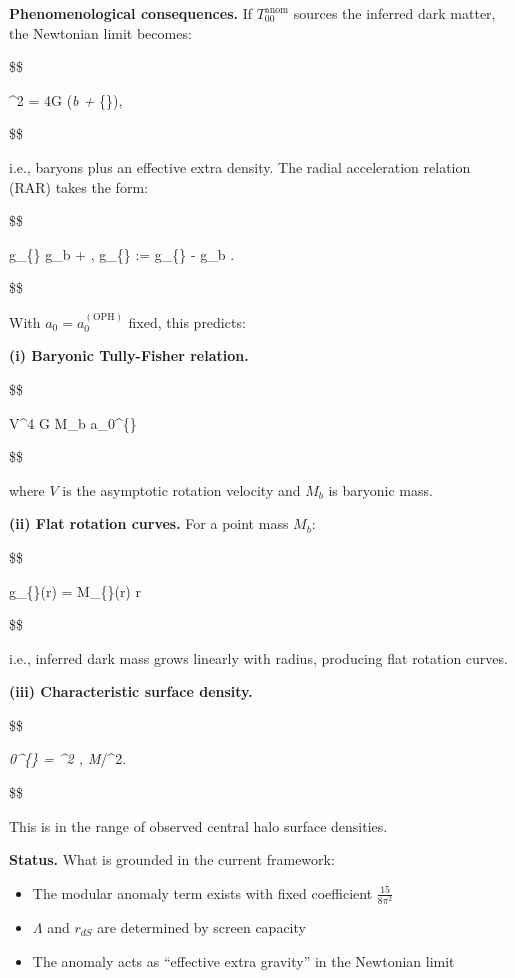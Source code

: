 \documentclass[11pt,a4paper]{article}
\theoremstyle{remark}
\providecommand{\tightlist}{%
  \setlength{\itemsep}{0pt}\setlength{\parskip}{0pt}}
\begin{document}
\textbf{Phenomenological consequences.} If \(T_{00}^{\mathrm{anom}}\) sources the
inferred dark matter, the Newtonian limit becomes:

\$\$

\nabla\^{}2 \Phi = 4\pi G (\rho\emph{b + \rho}\{\}),

\$\$

i.e., baryons plus an effective extra density. The radial acceleration
relation (RAR) takes the form:

\$\$

g\_\{\} \approx g\_b + ,
\quad
g\_\{\} := g\_\{\} - g\_b \approx {}.

\$\$

With \(a_0 = a_0^{\mathrm{(OPH)}}\) fixed, this predicts:

\textbf{(i) Baryonic Tully-Fisher relation.}

\$\$

V\^{}4 \approx G \cdot M\_b \cdot a\_0\^{}\{\}

\$\$

where \(V\) is the asymptotic rotation velocity and \(M_b\) is baryonic mass.

\textbf{(ii) Flat rotation curves.} For a point mass \(M_b\):

\$\$

g\_\{\}(r) = 
\quad \Rightarrow \quad
M\_\{\}(r) \propto r

\$\$

i.e., inferred dark mass grows linearly with radius, producing flat rotation
curves.

\textbf{(iii) Characteristic surface density.}

\$\$

\Sigma\emph{0\^{}\{\} = 
 \^{}2  , M}\odot/\^{}2.

\$\$

This is in the range of observed central halo surface densities.

\textbf{Status.} What is grounded in the current framework:

\begin{itemize}
\tightlist
\item
  The modular anomaly term exists with fixed coefficient \(\frac{15}{8\pi^2}\)
\item
  \(\Lambda\) and \(r_{dS}\) are determined by screen capacity
\item
  The anomaly acts as ``effective extra gravity'' in the Newtonian limit
\end{itemize}
\end{document}
